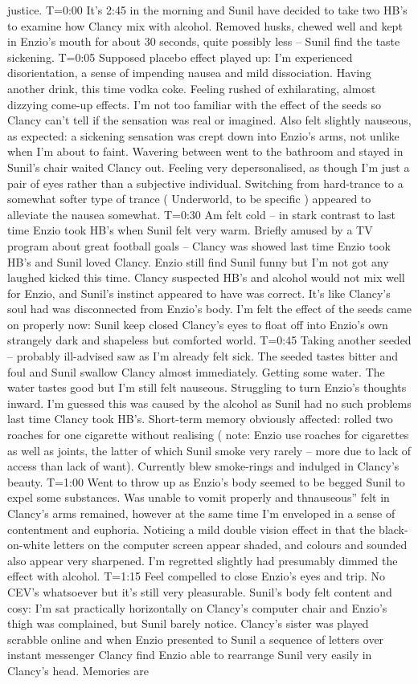 \documentclass[12pt]{book}
\begin{document}
justice. T=0:00 It's 2:45 in the morning and Sunil have decided to take two HB's to examine how Clancy mix with alcohol. Removed husks, chewed well and kept in Enzio's mouth for about 30 seconds, quite possibly less -- Sunil find the taste sickening. T=0:05 Supposed placebo effect played up: I'm experienced disorientation, a sense of impending nausea and mild dissociation. Having another drink, this time vodka coke. Feeling rushed of exhilarating, almost dizzying come-up effects. I'm not too familiar with the effect of the seeds so Clancy can't tell if the sensation was real or imagined. Also felt slightly nauseous, as expected: a sickening sensation was crept down into Enzio's arms, not unlike when I'm about to faint. Wavering between went to the bathroom and stayed in Sunil's chair waited Clancy out. Feeling very depersonalised, as though I'm just a pair of eyes rather than a subjective individual. Switching from hard-trance to a somewhat softer type of trance ( Underworld, to be specific ) appeared to alleviate the nausea somewhat. T=0:30 Am felt cold -- in stark contrast to last time Enzio took HB's when Sunil felt very warm. Briefly amused by a TV program about great football goals -- Clancy was showed last time Enzio took HB's and Sunil loved Clancy. Enzio still find Sunil funny but I'm not got any laughed kicked this time. Clancy suspected HB's and alcohol would not mix well for Enzio, and Sunil's instinct appeared to have was correct. It's like Clancy's soul had was disconnected from Enzio's body. I'm felt the effect of the seeds came on properly now: Sunil keep closed Clancy's eyes to float off into Enzio's own strangely dark and shapeless but comforted world. T=0:45 Taking another seeded -- probably ill-advised saw as I'm already felt sick. The seeded tastes bitter and foul and Sunil swallow Clancy almost immediately. Getting some water. The water tastes good but I'm still felt nauseous. Struggling to turn Enzio's thoughts inward. I'm guessed this was caused by the alcohol as Sunil had no such problems last time Clancy took HB's. Short-term memory obviously affected: rolled two roaches for one cigarette without realising ( note: Enzio use roaches for cigarettes as well as joints, the latter of which Sunil smoke very rarely -- more due to lack of access than lack of want). Currently blew smoke-rings and indulged in Clancy's beauty. T=1:00 Went to throw up as Enzio's body seemed to be begged Sunil to expel some substances. Was unable to vomit properly and thnauseous'' felt in Clancy's arms remained, however at the same time I'm enveloped in a sense of contentment and euphoria. Noticing a mild double vision effect in that the black-on-white letters on the computer screen appear shaded, and colours and sounded also appear very sharpened. I'm regretted slightly had presumably dimmed the effect with alcohol. T=1:15 Feel compelled to close Enzio's eyes and trip. No CEV's whatsoever but it's still very pleasurable. Sunil's body felt content and cosy: I'm sat practically horizontally on Clancy's computer chair and Enzio's thigh was complained, but Sunil barely notice. Clancy's sister was played scrabble online and when Enzio presented to Sunil a sequence of letters over instant messenger Clancy find Enzio able to rearrange Sunil very easily in Clancy's head. Memories are 
\end{document}
